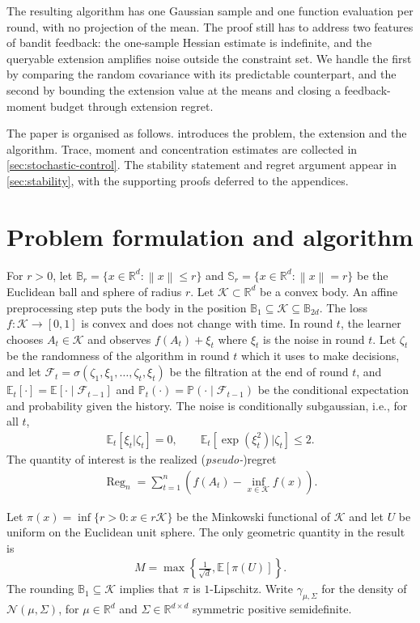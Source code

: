 \documentclass[11pt]{article}
\newcommand{\R}{\mathbb R}
\newcommand{\E}{\mathbb E}
\newcommand{\Pp}{\mathbb P}
\newcommand{\K}{\mathcal K}
\newcommand{\F}{\mathcal F}
\newcommand{\N}{\mathcal N}
\newcommand{\1}{\mathbf 1}
\newcommand{\norm}[1]{\left\lVert #1\right\rVert}
\begin{document}
The resulting algorithm has one Gaussian sample and one function evaluation
per round, with no projection of the mean.
The proof still has to address two features of bandit feedback:
the one-sample Hessian estimate is indefinite, and the queryable extension
amplifies noise outside the constraint set.
We handle the first by comparing the random covariance with its
predictable counterpart, and the second by bounding the extension value at the means and closing
a feedback-moment budget through extension regret.

The paper is organised as follows.   introduces the problem,
the extension and the algorithm.
Trace, moment and concentration estimates
are collected in \cref{sec:stochastic-control}.  The stability statement and
regret argument appear in \cref{sec:stability}, with the supporting proofs
deferred to the appendices.

\section{Problem formulation and algorithm}
\label{sec:setting}

For $r>0$, let $\mathbb{B}_r=\{x\in\R^d:\norm{x}\leq r\}$
and $\mathbb{S}_r=\{x\in\R^d:\norm{x}=r\}$ be the Euclidean ball and sphere of radius $r$.
Let $\K\subset\R^d$ be a convex body.  An affine preprocessing step puts the body
in the position $\mathbb{B}_1\subseteq\K\subseteq \mathbb{B}_{2d}$.
The loss $f:\K\to[0,1]$ is convex and does not change with time.  In round
$t$, the learner chooses $A_t\in\K$ and observes $f(A_t)+\xi_t$
where $\xi_t$ is the noise in round $t$.
Let $\zeta_t$ be the randomness of the algorithm in round $t$ which it uses to make decisions, and let
$\F_t=\sigma(\zeta_1,\xi_1,\ldots,\zeta_t,\xi_t)$ be the filtration at the end of round $t$,
and $\E_t[\cdot]=\E[\cdot\mid\F_{t-1}]$ and $\Pp_t(\cdot)=\Pp(\cdot\mid\F_{t-1})$ be the conditional expectation and probability given the history.
The noise is conditionally subgaussian, i.e., for all $t$,
\begin{align}
    \E_t[\xi_t|\zeta_t]=0,
    \qquad
    \E_t[\exp(\xi_t^2)|\zeta_t]\leq2.
    \label{eq:noise}
\end{align}
The quantity of interest is the realized (\textit{pseudo-})regret
\begin{align}
    \operatorname{Reg}_n
    =\sum_{t=1}^n\left(f(A_t)-\inf_{x\in\K}f(x)\right).
    \label{eq:regret}
\end{align}

Let $\pi(x)=\inf\{r>0:x\in r\K\}$ be the Minkowski functional of $\K$ and let
$U$ be uniform on the Euclidean unit sphere.
The only geometric quantity in the result is
\begin{align}
    M=\max\left\{\frac1{\sqrt d},\E[\pi(U)]\right\}.
    \label{eq:M}
\end{align}
The rounding  $\mathbb{B}_1\subseteq\K$ implies that $\pi$ is $1$-Lipschitz.
Write $\gamma_{\mu,\Sigma}$ for the density of
$\N(\mu,\Sigma)$, for $\mu\in\R^d$ and $\Sigma\in\R^{d\times d}$ symmetric positive semidefinite.
\end{document}
